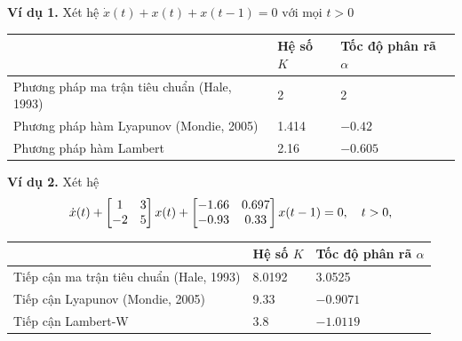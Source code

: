 \documentclass[10pt]{beamer}
\begin{document}
	\small{
	\begin{frame}
		\textbf{Ví dụ 1.} Xét hệ
		$\dot{x}(t) +x(t) + x(t-1) = 0 \mbox{ với mọi } t>0$
		\begin{table}[!h]
			\centering
			\begin{tabular}{|l|l|l|}
				\hline 
				& Hệ số $K$ & Tốc độ phân rã $\alpha$ \\ 
				\hline 
				Phương pháp ma trận tiêu chuẩn (Hale, 1993)  & 2& 2 \\			
				Phương pháp hàm Lyapunov (Mondie, 2005) & 1.414 & $-0.42$ \\ 	
				Phương pháp hàm Lambert & 2.16 & $-0.605$ \\		
				\hline 
			\end{tabular} 
			
			\label{bang 1}
		\end{table}
		\textbf{Ví dụ 2.} Xét hệ
		\begin{equation*}\label{45}
			\dot{x}(t) + \begin{bmatrix} 1&3\\-2&5 \end{bmatrix}x(t) + \begin{bmatrix} -1.66&0.697\\ -0.93& 0.33 \end{bmatrix}x(t-1) =0, \quad t >0 , 
		\end{equation*}
		\begin{table}[!h]
			\centering
			\begin{tabular}{|l|l|l|}
				\hline 
				& Hệ số $K$ & Tốc độ phân rã $\alpha$ \\ 
				\hline 
				Tiếp cận ma trận tiêu chuẩn (Hale, 1993) & 8.0192 & 3.0525 \\ 
				
				Tiếp cận Lyapunov (Mondie, 2005) & 9.33 & $-0.9071$ \\ 
				
				Tiếp cận Lambert-W & $3.8$ & $-1.0119$ \\ 
				\hline 
			\end{tabular} 
			\label{bang 2}
		\end{table}
	\end{frame}
	}
\end{document}
